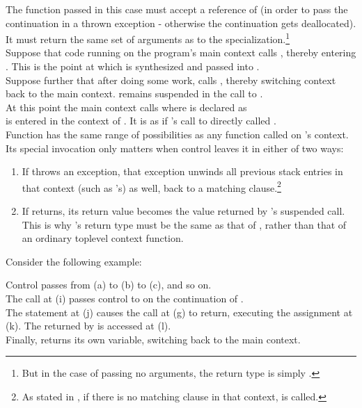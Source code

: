The function passed in this case must accept a reference of \cont (in order to
pass the continuation in a thrown exception - otherwise the continuation gets
deallocated). It must return the same set of arguments as to the
\resume specialization.\footnote{But in the case of passing no arguments, the
return type is simply .}\\

Suppose that code running on the program's main context calls ,
thereby entering . This is the point at which  is synthesized
and passed into .\\
Suppose further that after doing some work,  calls ,
thereby switching context back to the main context.  remains suspended
in the call to .\\
At this point the main context calls 
where  is declared as\\
  is entered in the context of .
It is as if 's call to  directly called .\\
Function  has the same range of possibilities as any function called on
's context. Its special invocation only matters when control leaves it
in either of two ways:

\begin{enumerate}
  \item If  throws an exception, that exception unwinds all previous
        stack entries in that context (such as 's) as well, back to a
        matching  clause.\footnote{As stated in ,
        if there is no matching  clause in that context,
         is called.}
  \item If  returns, its return value becomes the value returned by
        's suspended  call. This is why 's
        return type must be the same as that of \resume, rather than that of an
        ordinary toplevel context function.
\end{enumerate}

Consider the following example:


Control passes from (a) to (b) to (c), and so on.\\
The  call at (i) passes control
to  on the continuation of .\\
The  statement at (j) causes the \resume call at (g) to return,
executing the assignment at (k). The  returned by  is
accessed at (l).\\
Finally,  returns its own  variable, switching back to the main
context.


